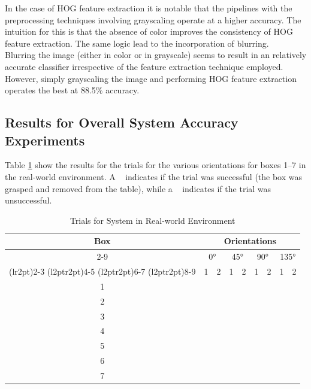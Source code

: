 \documentclass[letterpaper, 10 pt, conference]{conf/ieeeconf}  %
\newcommand{\cmark}{\ding{51}}%
\newcommand{\xmark}{\ding{55}}%
\begin{document}
In the case of HOG feature extraction it is notable that the pipelines with the
preprocessing techniques involving grayscaling operate at a higher accuracy. The
intuition for this is that the absence of color improves the consistency of HOG
feature extraction. The same logic lead to the incorporation of blurring.\\

Blurring the image (either in color or in grayscale) seems to result in an
relatively accurate classifier irrespective of the feature extraction technique
employed.\\

However, simply grayscaling the image and performing HOG feature
extraction operates the best at 88.5\% accuracy.

\subsection{Results for Overall System Accuracy Experiments}
Table \ref{tab:trials_real_world} show the results for the trials for the
various orientations for boxes 1--7 in the real-world environment. A \cmark~
indicates if the trial was successful (the box was grasped and removed from the
table), while a \xmark~ indicates if the trial was unsuccessful.
\begin{table}[H]
  \centering
  \begin{tabular}{c c c c c c c c c}
    \toprule
    \multirow{4}{*}[-0.5\dimexpr \aboverulesep + \belowrulesep + \cmidrulewidth]{Box} & \multicolumn{8}{c}{Orientations}\\
    \cmidrule(rl){2-9}
        & \multicolumn{2}{c}{\ang{0}} & \multicolumn{2}{c}{\ang{45}} & \multicolumn{2}{c}{\ang{90}} & \multicolumn{2}{c}{\ang{135}} \\
    \cmidrule(lr{2pt}){2-3}
    \cmidrule(l{2pt}r{2pt}){4-5}
    \cmidrule(l{2pt}r{2pt}){6-7}
    \cmidrule(l{2pt}r{2pt}){8-9}
        & 1      & 2      & 1      & 2      &  1     & 2      &  1     &  2     \\
    \midrule
    1 & \cmark & \cmark & \cmark & \cmark & \cmark & \cmark & \cmark & \cmark \\
    2 & \cmark & \cmark & \cmark & \cmark & \cmark & \cmark & \cmark & \cmark \\
    3 & \cmark & \cmark & \cmark & \cmark & \cmark & \cmark & \cmark & \cmark \\
    4 & \cmark & \cmark & \cmark & \cmark & \cmark & \cmark & \cmark & \cmark \\
    5 & \cmark & \cmark & \cmark & \cmark & \cmark & \cmark & \cmark & \cmark \\
    6 & \cmark & \cmark & \cmark & \cmark & \cmark & \cmark & \cmark & \cmark \\
    7 & \cmark & \cmark & \cmark & \cmark & \cmark & \cmark & \cmark & \cmark \\
    \bottomrule
  \end{tabular}
  \caption{Trials for System in Real-world Environment}
  \label{tab:trials_real_world}
\end{table}
\end{document}
